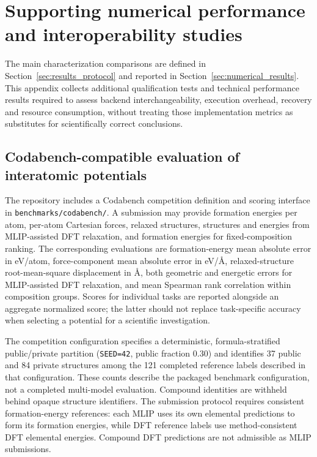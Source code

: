 \documentclass[11pt,a4paper]{article}
\begin{document}
\section{Supporting numerical performance and interoperability studies}
\label{sec:appendix:performance}
The main characterization comparisons are defined in Section~\ref{sec:results_protocol} and reported in Section~\ref{sec:numerical_results}. This appendix collects additional qualification tests and technical performance results required to assess backend interchangeability, execution overhead, recovery and resource consumption, without treating those implementation metrics as substitutes for scientifically correct conclusions.
\subsection{Codabench-compatible evaluation of interatomic potentials}
\label{sec:appendix:codabench}
The repository includes a Codabench competition definition and scoring interface in
\texttt{benchmarks/codabench/}. A submission may provide formation energies per atom,
per-atom Cartesian forces, relaxed structures, structures and energies from
MLIP-assisted DFT relaxation, and formation energies for fixed-composition ranking.
The corresponding evaluations are formation-energy mean absolute error in
eV/atom, force-component mean absolute error in eV/\AA, relaxed-structure
root-mean-square displacement in \AA, both geometric and energetic errors for
MLIP-assisted DFT relaxation, and mean Spearman rank correlation within
composition groups. Scores for individual tasks are reported alongside an
aggregate normalized score; the latter should not replace task-specific
accuracy when selecting a potential for a scientific investigation.

The competition configuration specifies a deterministic, formula-stratified
public/private partition (\texttt{SEED=42}, public fraction 0.30) and identifies
37 public and 84 private structures among the 121 completed reference labels
described in that configuration. These counts describe the packaged benchmark
configuration, not a completed multi-model evaluation. Compound identities
are withheld behind opaque structure identifiers. The submission protocol
requires consistent formation-energy references: each MLIP uses its own
elemental predictions to form its formation energies, while DFT reference
labels use method-consistent DFT elemental energies. Compound DFT predictions
are not admissible as MLIP submissions.
\end{document}
